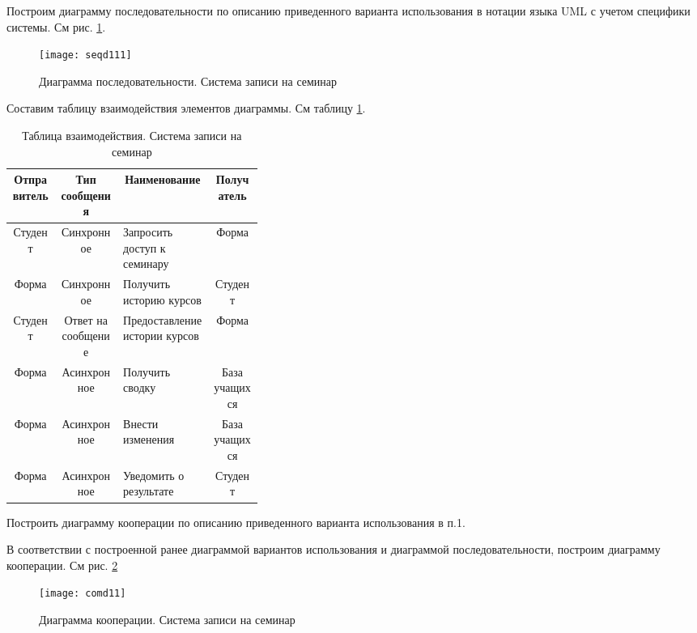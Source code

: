 \documentclass[a4paper,14pt]{extarticle}
\begin{document}
\begin{nonum}
Построим диаграмму последовательности по описанию приведенного варианта использования в нотации языка UML с учетом специфики системы. См рис. \ref{img:seqd1}.
\begin{figure}[h!]
	\centering
	\texttt{[image: seqd111]}
	\caption{Диаграмма последовательности. Система записи на семинар}
	\label{img:seqd1}
\end{figure}

Составим таблицу взаимодействия элементов диаграммы. См таблицу \ref{tab:one}.

\begin{table}[h!]
	\small
	\begin{tabular}{|c|c|m{0.36\linewidth}|c|}
		\hline
		\multicolumn{1}{|c|}{\textbf{Отправитель}} & \multicolumn{1}{c|}{\textbf{Тип сообщения}} & \multicolumn{1}{c|}{\textbf{Наименование}} & \multicolumn{1}{c|}{\textbf{Получатель}}\\ \hline 
		Студент & Синхронное & Запросить доступ к семинару & Форма \\ \hline
		Форма & Синхронное & Получить историю курсов & Студент \\ \hline
		Студент & Ответ на сообщение & Предоставление истории курсов & Форма \\ \hline
		Форма & Асинхронное & Получить сводку & База учащихся \\ \hline
		Форма & Асинхронное & Внести изменения & База учащихся \\ \hline
		Форма & Асинхронное & Уведомить о результате & Студент \\ \hline
	\end{tabular}
	\caption{Таблица взаимодействия. Система записи на семинар}
	\label{tab:one}
\end{table}
\normalsize
\end{nonum}

\begin{problem}
Построить диаграмму кооперации по описанию приведенного варианта
использования в п.1.
\end{problem}

\begin{nonum}
	В соответствии с построенной ранее диаграммой вариантов использования и диаграммой последовательности, построим диаграмму кооперации. См рис. \ref{img:comd1}
\begin{figure}[htbp]
	\centering
	\texttt{[image: comd11]}
	\caption{Диаграмма кооперации. Система записи на семинар}
	\label{img:comd1}
\end{figure}
\end{nonum}
\end{document}
